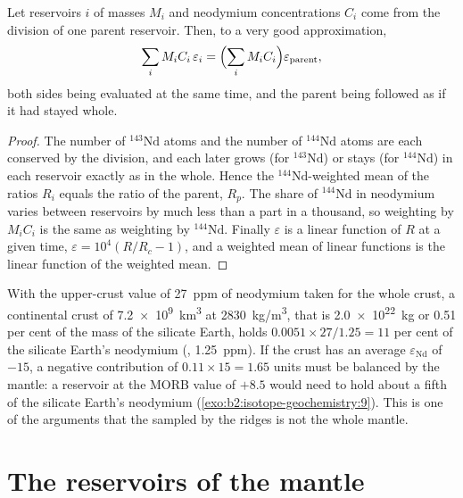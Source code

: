 \begin{proposition}\label{prop:b2:isotope-geochemistry:mass-balance}
Let reservoirs $i$ of masses $M_i$ and neodymium concentrations $C_i$ come from
the division of one parent reservoir. Then, to a very good approximation,
\[
  \sum_i M_i C_i\, \varepsilon_i = \Bigl(\sum_i M_i C_i\Bigr) \varepsilon_{\text{parent}},
\]
both sides being evaluated at the same time, and the parent being followed as if
it had stayed whole.
\end{proposition}

\begin{proof}
The number of $^{143}\mathrm{Nd}$ atoms and the number of $^{144}\mathrm{Nd}$ atoms
are each conserved by the division, and each later grows (for
$^{143}\mathrm{Nd}$) or stays (for $^{144}\mathrm{Nd}$) in each reservoir exactly as
in the whole. Hence the $^{144}\mathrm{Nd}$-weighted mean of the ratios $R_i$ equals
the ratio of the parent, $R_p$. The share of $^{144}\mathrm{Nd}$ in neodymium varies
between reservoirs by much less than a part in a thousand, so weighting by
$M_iC_i$ is the same as weighting by $^{144}\mathrm{Nd}$. Finally $\varepsilon$ is a
linear function of $R$ at a given time, $\varepsilon = 10^4(R/R_c - 1)$, and a
weighted mean of linear functions is the linear function of the weighted mean.
\end{proof}

With the upper-crust value of \qty{27}{ppm} of neodymium taken for the whole
crust, a continental crust of \qty{7.2e9}{km^3} at \qty{2830}{kg/m^3}, that is
\qty{2.0e22}{kg} or 0.51 per cent of the mass of the silicate Earth, holds
$0.0051\times27/1.25 = 11$ per cent of the silicate Earth's neodymium (, \qty{1.25}{ppm}). If the crust has an average $\varepsilon_{\mathrm{Nd}}$ of
$-15$, a negative contribution of $0.11\times15 = 1.65$ units must be
balanced by the mantle: a reservoir at the MORB value of $+8.5$ would need to hold
about a fifth of the silicate Earth's neodymium (\cref{exo:b2:isotope-geochemistry:9}). This is one of the
arguments that the  sampled by the ridges is not the whole
mantle.

\section{The reservoirs of the mantle}

